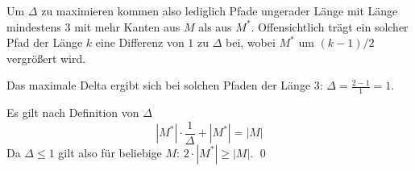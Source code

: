 \documentclass[a4paper]{article}
\begin{document}
Um $\Delta$ zu maximieren kommen also lediglich Pfade ungerader Länge mit
Länge mindestens $3$ mit mehr Kanten aus $M$ als aus $M^*$. Offensichtlich
trägt ein solcher Pfad der Länge $k$ eine Differenz von $1$ zu $\Delta$
bei, wobei $M^*$ um $(k-1) / 2$ vergrößert wird.

Das maximale Delta ergibt sich bei solchen Pfaden der Länge $3$:
$\Delta = \frac{2 - 1}{1} = 1$.

Es gilt nach Definition von $\Delta$
\[ |M^*| \cdot \frac{1}{\Delta} + |M^*| = |M| \]
Da $\Delta \leq 1$ gilt also für beliebige $M$: $2 \cdot |M^*| \geq |M|$.
\qed
\end{document}
